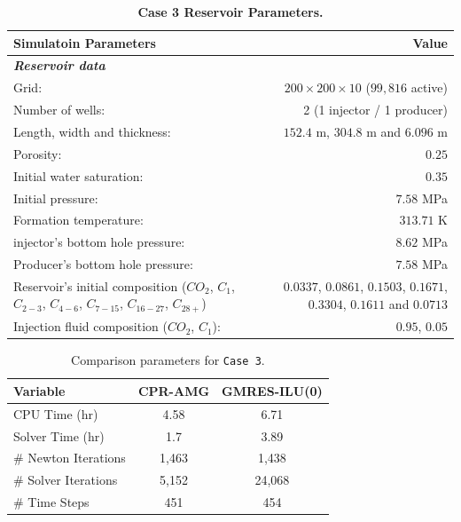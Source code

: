 \FloatBarrier
\begin{center}
\begin{table}[h!]
\begin{adjustbox}{width=\textwidth}
    \begin{threeparttable}
    \caption{\textbf{Case 3 Reservoir Parameters\supercite{fernandes}.}}
    \label{case3}
        \begin{tabular}{l r }
            \toprule
            Simulatoin Parameters & Value\\
            \midrule
	\rowcolor{red!20}\textit{\textbf{Reservoir data}}      & \\
	Grid:      &           $200\times200\times10$ ($99,816$ active) \\
	\rowcolor{blue!5}Number of wells:      &  2 (1 injector / 1 producer) \\
	Length, width and thickness:      & $152.4$ m, $304.8$ m and $6.096$ m\\
	\rowcolor{blue!5}Porosity:       &          $0.25$ \\
	Initial water saturation:    & $0.35$ \\      
	\rowcolor{blue!5}Initial pressure:    &      $7.58$ MPa\\
	Formation temperature:    & $313.71$ K     \\
	injector's bottom hole pressure:    &       $8.62$ MPa \\
	\rowcolor{blue!5}Producer’s bottom hole pressure:    &       $7.58$ MPa\\
	Reservoir’s initial composition ($CO_{2}$, $C_{1}$, $C_{2-3}$, $C_{4-6}$, $C_{7-15}$, $C_{16-27}$, $C_{28+}$) & $0.0337$, $0.0861$, $0.1503$, $0.1671$, $0.3304$, $0.1611$ and $0.0713$\\
	\rowcolor{blue!5}Injection ﬂuid composition ($CO_{2}$, $C_{1}$):    &   $0.95$, $0.05$\\
        \bottomrule
        \end{tabular}
    \end{threeparttable}
\end{adjustbox}    
\end{table}
\end{center}
\FloatBarrier

\begin{table}[h!]
   \caption{Comparison parameters for \texttt{Case 3}.}
   \label{case3-tab}
   \small
   \centering
   \begin{tabular}{lcc}
   \toprule\toprule
   \textbf{Variable} & \textbf{CPR-AMG} & \textbf{GMRES-ILU(0)} \\
   \midrule
   CPU Time (hr) & 4.58 & 6.71 \\
   Solver Time (hr) & 1.7 & 3.89 \\
   \# Newton Iterations & 1,463 & 1,438 \\
   \# Solver Iterations & 5,152 & 24,068\\
   \# Time Steps & 451 & 454 \\
   \bottomrule
   \end{tabular}
\end{table}

